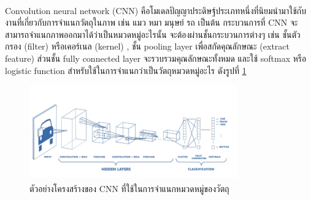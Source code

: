 Convolution neural network (CNN)\textsuperscript{\cite{cnn}} คือโมเดลปัญญาประดิษฐ์ประเภทหนึ่งที่นิยมนำมาใช้กับงานที่เกี่ยวกับการจำแนกวัตถุในภาพ เช่น แมว หมา มนุษย์ รถ เป็นต้น
กระบวนการที่ CNN จะสามารถจำแนกภาพออกมาได้ว่าเป็นหมวดหมู่อะไรนั้น จะต้องผ่านชั้นกระบวนการต่างๆ เช่น ชั้นตัวกรอง (filter) หรือเคอร์เนล (kernel) , ชั้น pooling layer 
เพื่อสกัดคุณลักษณะ (extract feature) ส่วนชั้น fully connected layer  จะรวบรวมคุณลักษณะทั้งหมด และใช้ softmax หรือ logistic function  สำหรับใช้ในการจำแนกว่าเป็นวัตถุหมวดหมู่อะไร ดังรูปที่ \ref{fig:CNN architecture}

\begin{figure}[!ht]
	\centering
	\includegraphics[width=0.8\textwidth]{chapter2/images/CNN.png}
		\caption[ตัวอย่างโครงสร้างของ CNN ที่ใช้ในการจำแนกหมวดหมู่ของวัตถุ]{ตัวอย่างโครงสร้างของ CNN ที่ใช้ในการจำแนกหมวดหมู่ของวัตถุ\textsuperscript{\cite{cnn}}}
    	\label{fig:CNN architecture}
\end{figure}

